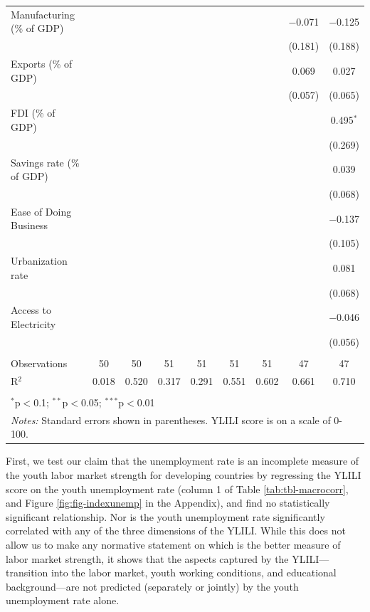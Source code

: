 \documentclass[
  a4paper, twoside, 12pt]{book}
\begin{document}
\begin{singlespace}
\begin{table}[H]
\begin{tabular}{@{\extracolsep{-5pt}}lcccccccc}
  Manufacturing (\% of GDP) &  &  &  &  &  &  & $-$0.071 & $-$0.125 \\ 
  &  &  &  &  &  &  & (0.181) & (0.188) \\ 
  Exports (\% of GDP) &  &  &  &  &  &  & 0.069 & 0.027 \\ 
  &  &  &  &  &  &  & (0.057) & (0.065) \\ 
  FDI (\% of GDP) &  &  &  &  &  &  &  & 0.495$^{*}$ \\ 
  &  &  &  &  &  &  &  & (0.269) \\ 
  Savings rate (\% of GDP) &  &  &  &  &  &  &  & 0.039 \\ 
  &  &  &  &  &  &  &  & (0.068) \\ 
  Ease of Doing Business &  &  &  &  &  &  &  & $-$0.137 \\ 
  &  &  &  &  &  &  &  & (0.105) \\ 
  Urbanization rate &  &  &  &  &  &  &  & 0.081 \\ 
  &  &  &  &  &  &  &  & (0.068) \\ 
  Access to Electricity &  &  &  &  &  &  &  & $-$0.046 \\ 
  &  &  &  &  &  &  &  & (0.056) \\ 
 \hline \\[-1.8ex] 
Observations & 50 & 50 & 51 & 51 & 51 & 51 & 47 & 47 \\ 
R$^{2}$ & 0.018 & 0.520 & 0.317 & 0.291 & 0.551 & 0.602 & 0.661 & 0.710 \\ 
\hline 
\hline \\[-1.8ex] 
\multicolumn{9}{l}{$^{*}$p$<$0.1; $^{**}$p$<$0.05; $^{***}$p$<$0.01} \\ 
\multicolumn{9}{l}{\textit{Notes:} Standard errors shown in parentheses. YLILI score is on a scale of 0-100.} \\ 
\end{tabular} 
\end{table} 
\end{singlespace}

First, we test our claim that the unemployment rate is an incomplete measure of the youth labor market strength for developing countries by regressing the YLILI score on the youth unemployment rate (column 1 of Table \ref{tab:tbl-macrocorr}, and Figure \ref{fig:fig-indexunemp} in the Appendix), and find no statistically significant relationship. Nor is the youth unemployment rate significantly correlated with any of the three dimensions of the YLILI. While this does not allow us to make any normative statement on which is the better measure of labor market strength, it shows that the aspects captured by the YLILI--- transition into the labor market, youth working conditions, and educational background---are not predicted (separately or jointly) by the youth unemployment rate alone.
\end{document}
